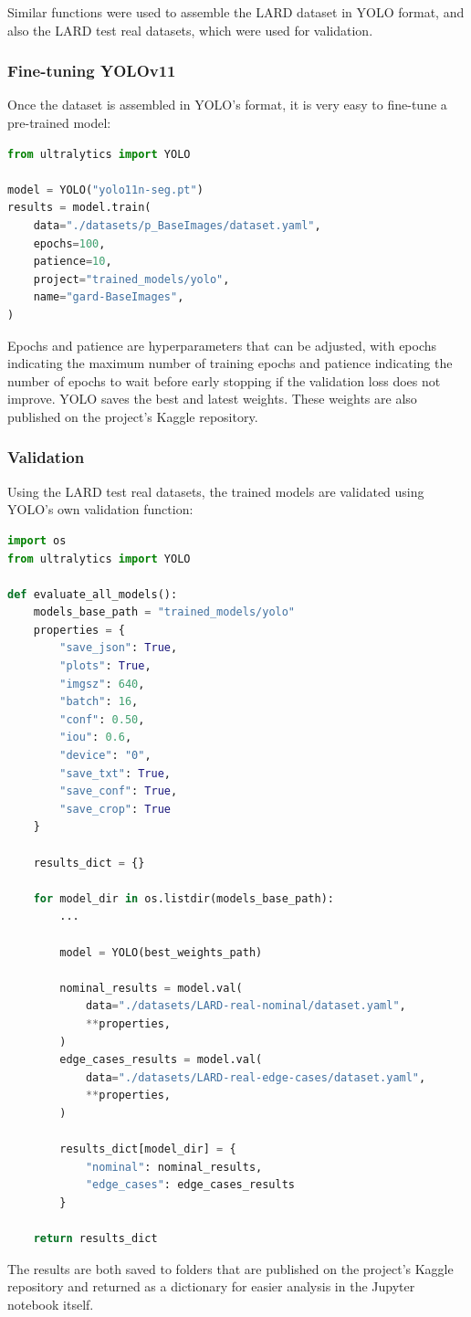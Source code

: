 Similar functions were used to assemble the LARD dataset in YOLO format, and
also the LARD test real datasets, which were used for validation.

\subsubsection{Fine-tuning YOLOv11}

Once the dataset is assembled in YOLO's format, it is very easy to fine-tune a
pre-trained model:

\begin{lstlisting}[language=Python, caption={Evaluation, fine-tuning YOLOv11}]
from ultralytics import YOLO

model = YOLO("yolo11n-seg.pt")
results = model.train(
    data="./datasets/p_BaseImages/dataset.yaml",
    epochs=100,
    patience=10,
    project="trained_models/yolo",
    name="gard-BaseImages",
)
\end{lstlisting}

Epochs and patience are hyperparameters that can be adjusted, with epochs
indicating the maximum number of training epochs and patience indicating the
number of epochs to wait before early stopping if the validation loss does not
improve. YOLO saves the best and latest weights. These weights are also
published on the project's Kaggle repository.

\subsubsection{Validation}

Using the LARD test real datasets, the trained models are validated using
YOLO's own validation function:

\begin{lstlisting}[language=Python, caption={Evaluation, YOLOv11 validation}]
import os
from ultralytics import YOLO

def evaluate_all_models():
    models_base_path = "trained_models/yolo"
    properties = {
        "save_json": True,
        "plots": True,
        "imgsz": 640,
        "batch": 16,
        "conf": 0.50,
        "iou": 0.6,
        "device": "0",
        "save_txt": True,
        "save_conf": True,
        "save_crop": True
    }
    
    results_dict = {}
    
    for model_dir in os.listdir(models_base_path):
        ...
        
        model = YOLO(best_weights_path)

        nominal_results = model.val(
            data="./datasets/LARD-real-nominal/dataset.yaml",
            **properties,
        )
        edge_cases_results = model.val(
            data="./datasets/LARD-real-edge-cases/dataset.yaml",
            **properties,
        )
        
        results_dict[model_dir] = {
            "nominal": nominal_results,
            "edge_cases": edge_cases_results
        }

    return results_dict
\end{lstlisting}

The results are both saved to folders that are published on the project's Kaggle
repository and returned as a dictionary for easier analysis in the Jupyter
notebook itself.
